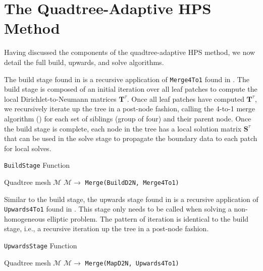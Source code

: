 \section{The Quadtree-Adaptive HPS Method}
\label{sec:algorithms}

Having discussed the components of the quadtree-adaptive HPS method, we now detail the full build, upwards, and solve algorithms.

The build stage found in  is a recursive application of \texttt{Merge4To1} found in . The build stage is composed of an initial iteration over all leaf patches to compute the local Dirichlet-to-Neumann matrices $\textbf{T}^{\tau}$. Once all leaf patches have computed $\textbf{T}^{\tau}$, we recursively iterate up the tree in a post-node fashion, calling the 4-to-1 merge algorithm () for each set of siblings (group of four) and their parent node. Once the build stage is complete, each node in the tree has a local solution matrix $\textbf{S}^{\tau}$ that can be used in the solve stage to propagate the boundary data to each patch for local solves.

\begin{algorithm}[ht]
    \caption{\texttt{BuildStage} Function}
    \begin{algorithmic}[0]
        \Require Quadtree mesh $\mathcal{M}$
        \State $\mathcal{M} \rightarrow$ \texttt{Merge(BuildD2N, Merge4To1)} 
    \end{algorithmic}
    \label{alg:build_stage}
\end{algorithm}

Similar to the build stage, the upwards stage found in  is a recursive application of {\texttt{Upwards4To1}} found in . This stage only needs to be called when solving a non-homogeneous elliptic problem. The pattern of iteration is identical to the build stage, i.e., a recursive iteration up the tree in a post-node fashion.

\begin{algorithm}[ht]
    \caption{\texttt{UpwardsStage} Function}
    \begin{algorithmic}[0]
        \Require Quadtree mesh $\mathcal{M}$
        \State $\mathcal{M} \rightarrow$ \texttt{Merge(MapD2N, Upwards4To1)} 
    \end{algorithmic}
    \label{alg:upwards_stage}
\end{algorithm}

